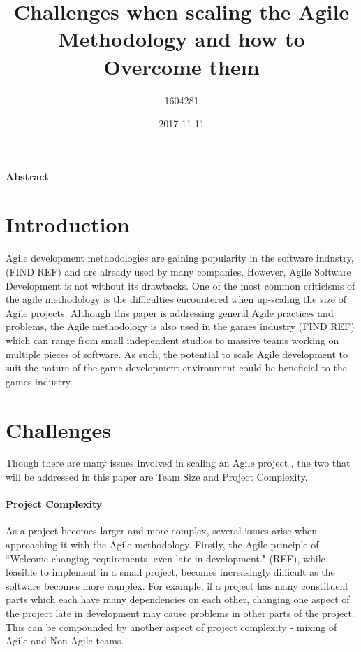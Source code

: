 \documentclass{article}
\title{Challenges when scaling the Agile Methodology and how to Overcome them}
\date{2017-11-11}
\author{1604281}
\begin{document}
\maketitle
{}

\paragraph{Abstract}


\section{Introduction}

Agile development methodologies are gaining popularity in the software industry, (FIND REF) and are already used by many companies. However, Agile Software Development is not without its drawbacks. One of the most common criticisms of the agile methodology \cite{begel2007usage} is the difficulties encountered when up-scaling the size of Agile projects. Although this paper is addressing general Agile practices and problems, the Agile methodology is also used in the games industry (FIND REF) which can range from small independent studios to massive teams working on multiple pieces of software. As such, the potential to scale Agile development to suit the nature of the game development environment could be beneficial to the games industry. 

\section{Challenges}

Though there are many issues involved in scaling an Agile project \cite{turk2014limitations}, the two that will be addressed in this paper are Team Size and Project Complexity. 

\paragraph{Project Complexity}\mbox{}\newline

As a project becomes larger and more complex, several issues arise when approaching it with the Agile methodology. Firstly, the Agile principle of ``Welcome changing requirements, even late in development." (REF), while feasible to implement in a small project, becomes increasingly difficult as the software becomes more complex. For example, if a project has many constituent parts which each have many dependencies on each other, changing one aspect of the project late in development may cause problems in other parts of the project. This can be compounded by another aspect of project complexity - mixing of Agile and Non-Agile teams. \\
\end{document}
